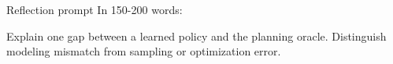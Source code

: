 \documentclass[aspectratio=169,11pt]{beamer}
\begin{document}
\begin{frame}{Reflection prompt}
In 150-200 words:

Explain one gap between a learned policy and the planning oracle. Distinguish modeling mismatch from sampling or optimization error.
\end{frame}
\end{document}
